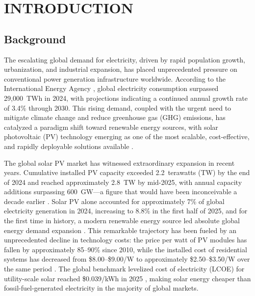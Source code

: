 \chapter{INTRODUCTION}

\section{Background}

The escalating global demand for electricity, driven by rapid population growth, urbanization, and industrial expansion, has placed unprecedented pressure on conventional power generation infrastructure worldwide. According to the International Energy Agency \cite{iea2024}, global electricity consumption surpassed 29,000~TWh in 2024, with projections indicating a continued annual growth rate of 3.4\% through 2030. This rising demand, coupled with the urgent need to mitigate climate change and reduce greenhouse gas (GHG) emissions, has catalyzed a paradigm shift toward renewable energy sources, with solar photovoltaic (PV) technology emerging as one of the most scalable, cost-effective, and rapidly deployable solutions available \cite{irena2024}.

The global solar PV market has witnessed extraordinary expansion in recent years. Cumulative installed PV capacity exceeded 2.2~terawatts (TW) by the end of 2024 and reached approximately 2.8~TW by mid-2025, with annual capacity additions surpassing 600~GW---a figure that would have been inconceivable a decade earlier \cite{ieapvps2025,ren21_2025}. Solar PV alone accounted for approximately 7\% of global electricity generation in 2024, increasing to 8.8\% in the first half of 2025, and for the first time in history, a modern renewable energy source led absolute global energy demand expansion \cite{ember2025,pvtech2025}. This remarkable trajectory has been fueled by an unprecedented decline in technology costs: the price per watt of PV modules has fallen by approximately 85--90\% since 2010, while the installed cost of residential systems has decreased from \$8.00--\$9.00/W to approximately \$2.50--\$3.50/W over the same period \cite{owid2024,nrel2024}. The global benchmark levelized cost of electricity (LCOE) for utility-scale solar reached \$0.039/kWh in 2025 \cite{bnef2025}, making solar energy cheaper than fossil-fuel-generated electricity in the majority of global markets.

